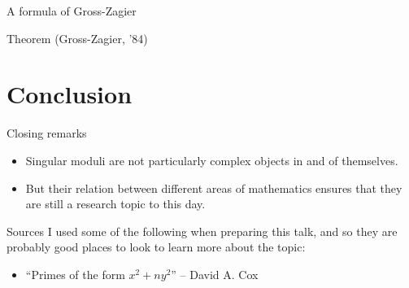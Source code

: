 \documentclass{beamer}
\begin{document}
\begin{frame}{A formula of Gross-Zagier}
\begin{block}{Theorem (Gross-Zagier, '84)}
\end{block}
\end{frame}

\section{Conclusion}
\begin{frame}{Closing remarks}
\begin{itemize}
\item Singular moduli are not particularly complex objects in and of themselves.
\pause \item But their relation between different areas of mathematics ensures that they are still a research topic to this day.
\end{itemize}
\end{frame}

\begin{frame}{Sources}
I used some of the following when preparing this talk, and so they are probably good places to look to learn more about the topic:
\begin{itemize}
\item ``Primes of the form $x^2 + ny^2$'' -- David A. Cox
\end{itemize}
\end{frame}
\end{document}

